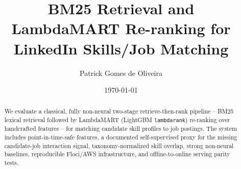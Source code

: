 \documentclass[10pt,twocolumn]{article}
\title{BM25 Retrieval and LambdaMART Re-ranking for\\LinkedIn Skills/Job Matching}
\author{Patrick Gomes de Oliveira}
\date{\today}
\begin{document}
\maketitle
\begin{abstract}
We evaluate a classical, fully non-neural two-stage retrieve-then-rank
pipeline -- BM25 lexical retrieval followed by LambdaMART (LightGBM
\texttt{lambdarank}) re-ranking over handcrafted features -- for matching
candidate skill profiles to job postings. The system includes
point-in-time-safe features, a documented self-supervised proxy for the
missing candidate-job interaction signal, taxonomy-normalized skill
overlap, strong non-neural baselines, reproducible Floci/AWS
infrastructure, and offline-to-online serving parity tests.
\end{abstract}







\nocite{*}


\end{document}
